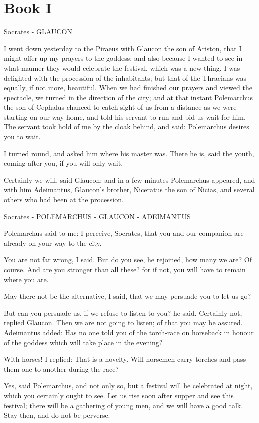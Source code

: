 \chapter{Book I}

Socrates - GLAUCON

I went down yesterday to the Piraeus with Glaucon the son of Ariston, that I might offer up my prayers to the goddess; and also because I wanted to see in what manner they would celebrate the festival, which was a new thing. I was delighted with the procession of the inhabitants; but that of the Thracians was equally, if not more, beautiful. When we had finished our prayers and viewed the spectacle, we turned in the direction of the city; and at that instant Polemarchus the son of Cephalus chanced to catch sight of us from a distance as we were starting on our way home, and told his servant to run and bid us wait for him. The servant took hold of me by the cloak behind, and said: Polemarchus desires you to wait.

I turned round, and asked him where his master was.
There he is, said the youth, coming after you, if you will only wait.

Certainly we will, said Glaucon; and in a few minutes Polemarchus appeared, and with him Adeimantus, Glaucon's brother, Niceratus the son of Nicias, and several others who had been at the procession.

Socrates - POLEMARCHUS - GLAUCON - ADEIMANTUS

Polemarchus said to me: I perceive, Socrates, that you and our companion are already on your way to the city.

You are not far wrong, I said.
But do you see, he rejoined, how many we are?
Of course.
And are you stronger than all these? for if not, you will have to remain where you are.

May there not be the alternative, I said, that we may persuade you to let us go?

But can you persuade us, if we refuse to listen to you? he said.
Certainly not, replied Glaucon.
Then we are not going to listen; of that you may be assured.
Adeimantus added: Has no one told you of the torch-race on horseback in honour of the goddess which will take place in the evening?

With horses! I replied: That is a novelty. Will horsemen carry torches and pass them one to another during the race?

Yes, said Polemarchus, and not only so, but a festival will he celebrated at night, which you certainly ought to see. Let us rise soon after supper and see this festival; there will be a gathering of young men, and we will have a good talk. Stay then, and do not be perverse.

